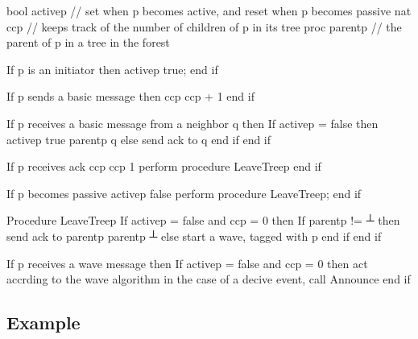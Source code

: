 \documentclass[letterpaper,10pt,english]{sphinxmanual}
\begin{document}
\begin{sphinxVerbatim}[commandchars=\\\{\},numbers=left,firstnumber=1,stepnumber=1]
bool active\PYGZlt{}p\PYGZgt{} // set when p becomes active, and reset when p becomes passive
nat cc\PYGZlt{}p\PYGZgt{} // keeps track of the number of children of p in its tree
proc parent\PYGZlt{}p\PYGZgt{} // the parent of p in a tree in the forest

If p is an initiator then
    active\PYGZlt{}p\PYGZgt{} \PYGZlt{}\PYGZhy{} true;
end if

If p sends a basic message then
    cc\PYGZlt{}p\PYGZgt{} \PYGZlt{}\PYGZhy{} cc\PYGZlt{}p\PYGZgt{} + 1
end if

If p receives a basic message from a neighbor q then
    If active\PYGZlt{}p\PYGZgt{} = false then
        active\PYGZlt{}p\PYGZgt{} \PYGZlt{}\PYGZhy{} true
        parent\PYGZlt{}p\PYGZgt{} \PYGZlt{}\PYGZhy{} q
    else
        send \PYGZlt{}ack\PYGZgt{} to q
    end if
end if

If p receives \PYGZlt{}ack\PYGZgt{}
    cc\PYGZlt{}p\PYGZgt{} \PYGZlt{}\PYGZhy{} cc\PYGZlt{}p\PYGZgt{} \PYGZhy{} 1
    perform procedure LeaveTree\PYGZlt{}p\PYGZgt{}
end if

If p becomes passive
    active\PYGZlt{}p\PYGZgt{} \PYGZlt{}\PYGZhy{} false
    perform procedure LeaveTree\PYGZlt{}p\PYGZgt{};
end if

Procedure LeaveTree\PYGZlt{}p\PYGZgt{}
    If active\PYGZlt{}p\PYGZgt{} = false and cc\PYGZlt{}p\PYGZgt{} = 0 then
        If parent\PYGZlt{}p\PYGZgt{} != ┴ then
            send \PYGZlt{}ack\PYGZgt{} to parent\PYGZlt{}p\PYGZgt{}
            parent\PYGZlt{}p\PYGZgt{} \PYGZlt{}\PYGZhy{} ┴
        else
            start a wave, tagged with p
        end if
    end if

If p receives a wave message then
    If active\PYGZlt{}p\PYGZgt{} = false and cc\PYGZlt{}p\PYGZgt{} = 0 then
        act accrding to the wave algorithm
        in the case of a decive event, call Announce
    end if
\end{sphinxVerbatim}


\subsection{Example}
\label{\detokenize{docs/ShavitFranchezAlg/algorithm:example}}
\end{document}
